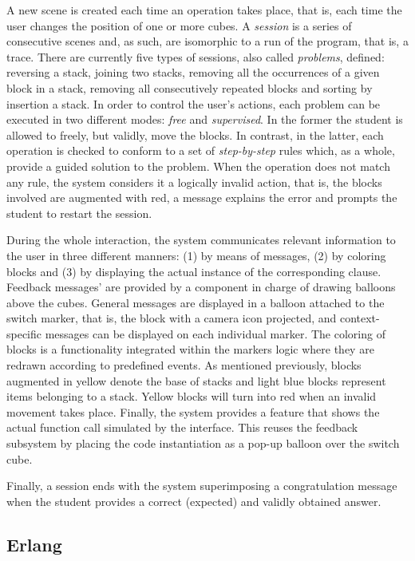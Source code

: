 A new scene is created each time an operation takes place, that is,
each time the user changes the position of one or more cubes. A
\emph{session} is a series of consecutive scenes and, as such, are
isomorphic to a run of the program, that is, a trace.
There are currently five types of sessions, also called
\emph{problems}, defined: reversing a stack, joining two stacks,
removing all the occurrences of a given block in a stack, removing all
consecutively repeated blocks and sorting by insertion a stack. In
order to control the user's actions, each problem can be executed in
two different modes: \emph{free} and \emph{supervised}. In the former
the student is allowed to freely, but validly, move the blocks. In
contrast, in the latter, each operation is checked to conform to a set
of \emph{step\hyp{}by\hyp{}step} rules which, as a whole, provide a
guided solution to the problem. When the operation does not match any
rule, the system considers it a logically invalid action, that is, the
blocks involved are augmented with red, a message explains the error
and prompts the student to restart the session.

During the whole interaction, the system communicates relevant
information to the user in three different manners: (1) by means of
messages, (2) by coloring blocks and (3) by displaying the actual
instance of the corresponding \erlang clause. Feedback messages' are
provided by a component in charge of drawing balloons above the cubes.
General messages are displayed in a balloon attached to the switch
marker, that is, the block with a camera icon projected, and
context\hyp{}specific messages can be displayed on each individual
marker. The coloring of blocks is a functionality integrated within
the markers logic where they are redrawn according to predefined
events. As mentioned previously, blocks augmented in yellow denote the
base of stacks and light blue blocks represent items belonging to a
stack. Yellow blocks will turn into red when an invalid movement takes
place. Finally, the system provides a feature that shows the actual
\erlang function call simulated by the interface. This reuses the
feedback subsystem by placing the code instantiation as a pop\hyp{}up
balloon over the switch cube.

Finally, a session ends with the system superimposing a congratulation
message when the student provides a correct (expected) and validly
obtained answer.

\subsection{Erlang}

